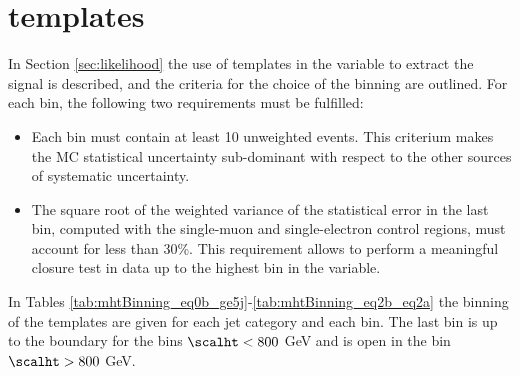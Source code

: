 \section{\mht templates}
\label{sec:mht_templates}

In Section \ref{sec:likelihood} the use of templates in the \mht variable to extract the signal is described, and the criteria for the choice of the binning are outlined. For each bin, the following two requirements must be fulfilled:
\begin{itemize}
  \item Each bin must contain at least 10 unweighted events. This criterium makes the MC statistical uncertainty sub-dominant with respect to the other sources of systematic uncertainty.
    \item The square root of the weighted variance of the statistical error in the last \mht bin, computed with the single-muon and single-electron control regions, must account for less than 30\%. This requirement allows to perform a meaningful closure test in data up to the highest bin in the \mht variable.
\end{itemize}

In Tables \ref{tab:mhtBinning_eq0b_ge5j}-\ref{tab:mhtBinning_eq2b_eq2a} the binning of the \mht templates are given for each jet category and each \scalht bin. The last bin is up to the \scalht boundary for the bins $\scalht<800$ GeV and is open in the bin $\scalht>800$ GeV.

\newpage

